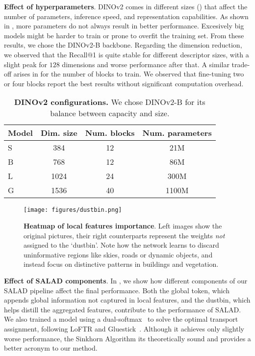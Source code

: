\documentclass[10pt,twocolumn,letterpaper]{article}
\begin{document}
\textbf{Effect of hyperparameters}.
DINOv2 comes in different sizes () that affect the number of parameters, inference speed, and representation capabilities. As shown in , more parameters do not always result in better performance. Excesively big models might be harder to train or prone to overfit the training set. From these results, we chose the DINOv2-B backbone. Regarding the dimension reduction, we observed that the Recall@1 is quite stable for different descriptor sizes, with a slight peak for $128$ dimensions and worse performance after that. A similar trade-off arises in  for the number of blocks to train. We observed that fine-tuning two or four blocks report the best results without significant computation overhead. 


\begin{table}
    \centering
    \small
    \begin{tabular}{l c c c}
    \hline

    \hline
    Model & Dim. size & Num. blocks & Num. parameters\\
    \hline
        S & 384 & 12 & 21M\\
        B & 768 & 12 & 86M\\
        L & 1024 & 24 & 300M\\
        G & 1536 & 40 & 1100M\\
    \hline

    \hline
    \end{tabular}
    \caption{\textbf{DINOv2 configurations.} We chose DINOv2-B for its balance between capacity and size.}
\label{tab:dinosizes}
\end{table}

\begin{figure*}
  \centering
   \texttt{[image: figures/dustbin.png]}
   \caption{\textbf{Heatmap of local features importance}. Left images show the original pictures, their right counterparts represent the weights \textit{not} assigned to the `dustbin'. Note how the network learns to discard uninformative regions like skies, roads or dynamic objects, and instead focus on distinctive patterns in buildings and vegetation.}
   \label{fig:dustbin}
\end{figure*}

\textbf{Effect of SALAD components}.
In , we show how different components of our SALAD pipeline affect the final performance. Both the global token, which appends global information not captured in local features, and the dustbin, which helps distill the aggregated features, contribute to the performance of SALAD. We also trained a model using a dual-softmax~\cite{rocco2018neighbourhood} to solve the optimal transport assignment, following  LoFTR and Gluestick~\cite{sun2021loftr, pautrat2023gluestick}. Although it achieves only slightly worse performance, the Sinkhorn Algorithm its theoretically sound and provides a better acronym to our method.
\end{document}
